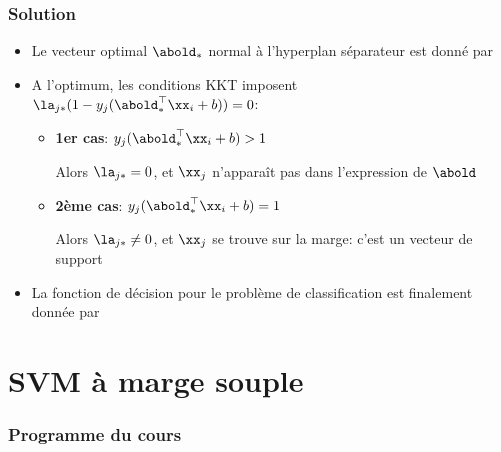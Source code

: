 \documentclass[9pt,table]{beamer} %
\begin{document}
\begin{frame}
\frametitle{Solution}

\begin{itemize}[label=\tiny$\blacksquare$]
	\item Le vecteur optimal $\abold_*$ normal à l'hyperplan séparateur est donné par
	\item A l'optimum, les conditions KKT imposent
	$\la_{j*}(1-y_j(\abold_*^\top \xx_i+b)) = 0$:
	\begin{itemize}
	\item \alert{\textbf{1er cas}}:\; $y_j(\abold_*^\top \xx_i + b) > 1$
	
	\qquad Alors $\la_{j*} = 0$, et $\xx_j$ n'apparaît pas dans l'expression de $\abold$
	
	\item \alert{\textbf{2ème cas}}:\; $y_j(\abold_*^\top \xx_i + b) = 1$
	
	\qquad Alors $\la_{j*} \neq 0$, et $\xx_j$ se trouve sur la marge: c'est un \alert{vecteur de support}
	
	
\end{itemize}
\item La fonction de décision pour le problème de classification est finalement donnée par
\end{itemize}

\end{frame}



\section{SVM à marge souple}

\begin{frame}
\frametitle{Programme du cours}
\tableofcontents[currentsection]
\end{frame}
\end{document}

